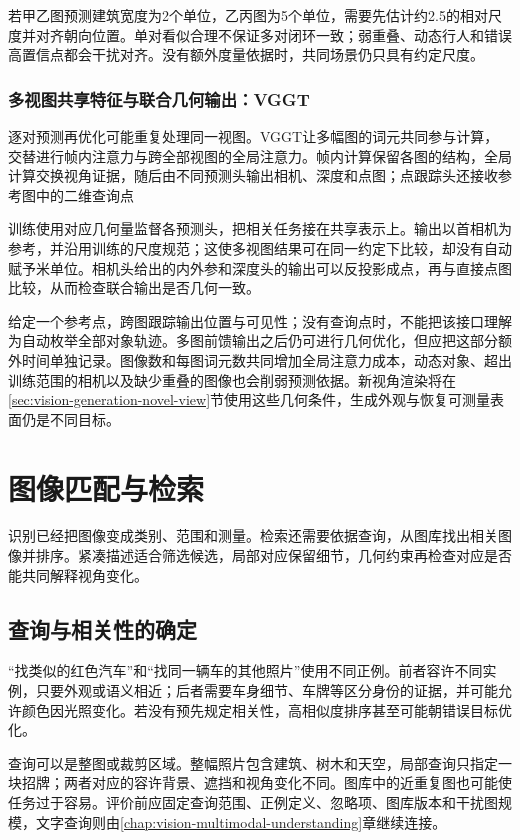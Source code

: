 若甲乙图预测建筑宽度为2个单位，乙丙图为5个单位，需要先估计约2.5的相对尺度并对齐朝向位置。单对看似合理不保证多对闭环一致；弱重叠、动态行人和错误高置信点都会干扰对齐。没有额外度量依据时，共同场景仍只具有约定尺度。

\subsubsection{多视图共享特征与联合几何输出：VGGT}
\label{sec:vision-recognition-vggt}

逐对预测再优化可能重复处理同一视图。VGGT让多幅图的词元共同参与计算，交替进行帧内注意力与跨全部视图的全局注意力。帧内计算保留各图的结构，全局计算交换视角证据，随后由不同预测头输出相机、深度和点图；点跟踪头还接收参考图中的二维查询点

训练使用对应几何量监督各预测头，把相关任务接在共享表示上。输出以首相机为参考，并沿用训练的尺度规范；这使多视图结果可在同一约定下比较，却没有自动赋予米单位。相机头给出的内外参和深度头的输出可以反投影成点，再与直接点图比较，从而检查联合输出是否几何一致。

给定一个参考点，跨图跟踪输出位置与可见性；没有查询点时，不能把该接口理解为自动枚举全部对象轨迹。多图前馈输出之后仍可进行几何优化，但应把这部分额外时间单独记录。图像数和每图词元数共同增加全局注意力成本，动态对象、超出训练范围的相机以及缺少重叠的图像也会削弱预测依据。新视角渲染将在\ref{sec:vision-generation-novel-view}节使用这些几何条件，生成外观与恢复可测量表面仍是不同目标。

\section{图像匹配与检索}
\label{sec:vision-recognition-retrieval}

识别已经把图像变成类别、范围和测量。检索还需要依据查询，从图库找出相关图像并排序。紧凑描述适合筛选候选，局部对应保留细节，几何约束再检查对应是否能共同解释视角变化。

\subsection{查询与相关性的确定}
\label{sec:vision-recognition-relevance}

“找类似的红色汽车”和“找同一辆车的其他照片”使用不同正例。前者容许不同实例，只要外观或语义相近；后者需要车身细节、车牌等区分身份的证据，并可能允许颜色因光照变化。若没有预先规定相关性，高相似度排序甚至可能朝错误目标优化。

查询可以是整图或裁剪区域。整幅照片包含建筑、树木和天空，局部查询只指定一块招牌；两者对应的容许背景、遮挡和视角变化不同。图库中的近重复图也可能使任务过于容易。评价前应固定查询范围、正例定义、忽略项、图库版本和干扰图规模，文字查询则由\ref{chap:vision-multimodal-understanding}章继续连接。

